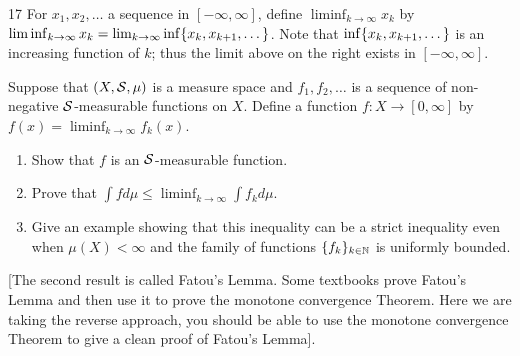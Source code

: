 \begin{exercise}{17}
For $x_1, x_2, \dots$ a sequence in $[-\infty, \infty]$, define $\liminf_{k \to \infty} x_k$ by $\liminf_{k \to \infty} x_k = \lim_{k \to \infty} \inf\{x_k, x_{k+1}, \dots\}$.
Note that $\inf \{x_k, x_{k+1}, \dots\}$ is an increasing function of $k$;
thus the limit above on the right exists in $[-\infty, \infty]$.

Suppose that $(X, \mathcal{S}, \mu)$ is a measure space and $f_1, f_2, \dots$ is a sequence of non-negative $\mathcal{S}$-measurable functions on $X$.
Define a function $f: X \to [0, \infty]$ by $f(x) = \liminf_{k \to \infty} f_k(x)$.
\begin{enumerate}
    \item Show that $f$ is an $\mathcal{S}$-measurable function.
    \item Prove that $\int f  d\mu \leq \liminf_{k \to \infty} \int f_k d\mu$.
    \item Give an example showing that this inequality can be a strict inequality even when $\mu(X) < \infty$ and the family of functions $\{f_k\}_{k \in \mathbb{N}}$ is uniformly bounded.
\end{enumerate}
[The second result is called Fatou's Lemma.
Some textbooks prove Fatou's Lemma and then use it to prove the monotone convergence Theorem.
Here we are taking the reverse approach, you should be able to use the monotone convergence Theorem to give a clean proof of Fatou's Lemma].
\end{exercise}
